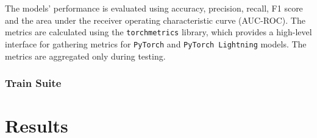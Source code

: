 \documentclass[english, he, bc, kiv, iso690alph]{fasthesis}
\begin{document}
The models' performance is evaluated using accuracy, precision, recall, F1 score and the area under the receiver operating characteristic curve (AUC-ROC). The metrics are calculated using the \texttt{torchmetrics} library, which provides a high-level interface for gathering metrics for \texttt{PyTorch} and \texttt{PyTorch Lightning} models. The metrics are aggregated only during testing.


\subsection{Train Suite}

\chapter{Results}
\label{chap:results}


\backmatter
\printbibliography
\listoffigures
\listoftables
\listoflistings

\setbackpageqrcode
\backpage
\end{document}
